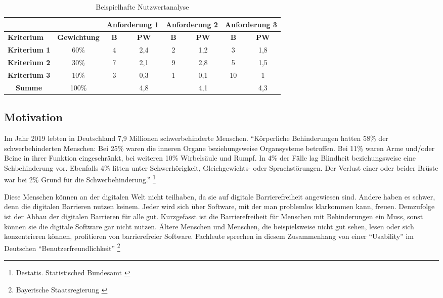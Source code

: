 \begin{table}[H]
\caption[Beispielhafte Nutzwertanalyse]{Beispielhafte Nutzwertanalyse}
\vspace{0,1cm}
\begin{tabular}{cc|c|c|c|c|c|c|}
	\cline{3-8}
	& & \multicolumn{2}{c|}{\textbf{Anforderung 1}} & \multicolumn{2}{c|}{\textbf{Anforderung 2}} & \multicolumn{2}{c|}{\textbf{Anforderung 3}} \\ \hline
	\multicolumn{1}{|l|}{\textbf{Kriterium}} & \textbf{Gewichtung} & \textbf{B} & \textbf{PW} & \textbf{B} & \textbf{PW} & \textbf{B} & \textbf{PW} \\ \hline
	\multicolumn{1}{|l|}{\textbf{Kriterium 1}} & 60\%  & 4 & 2,4 & 2 & 1,2 & 3  & 1,8 \\ \hline
	\multicolumn{1}{|l|}{\textbf{Kriterium 2}} & 30\%  & 7 & 2,1 & 9 & 2,8 & 5  & 1,5 \\ \hline
	\multicolumn{1}{|l|}{\textbf{Kriterium 3}} & 10\%  & 3 & 0,3 & 1 & 0,1 & 10 & 1   \\ \hline
	\multicolumn{1}{|c|}{\textbf{Summe}}       & 100\% &   & 4,8 &   & 4,1 &    & 4,3 \\ \cline{1-2} \cline{4-4} \cline{6-6} \cline{8-8} 
\end{tabular}
\label{table:Beispielhafte Nutzwertanalyse}
\end{table}

\subsection{Motivation}

Im Jahr 2019 lebten in Deutschland 7,9 Millionen schwerbehinderte Menschen. "`Körperliche Behinderungen hatten 58\% der schwerbehinderten Menschen: Bei 25\% waren die inneren Organe beziehungsweise Organsysteme betroffen. Bei 11\% waren Arme und/oder Beine in ihrer Funktion eingeschränkt, bei weiteren 10\% Wirbelsäule und Rumpf. In 4\% der Fälle lag Blindheit beziehungsweise eine Sehbehinderung vor. Ebenfalls 4\% litten unter Schwerhörigkeit, Gleichgewichts- oder Sprachstörungen. Der Verlust einer oder beider Brüste war bei 2\% Grund für die Schwerbehinderung."' \footnote{Destatis. Statistisched Bundesamt \cite{DESTATIS}}

Diese Menschen können an der digitalen Welt nicht teilhaben, da sie auf digitale Barrierefreiheit angewiesen sind. Andere haben es schwer, denn die digitalen Barrieren nutzen keinem. Jeder wird sich über Software, mit der man problemlos klarkommen kann, freuen. Demzufolge ist der Abbau der digitalen Barrieren für alle gut. Kurzgefasst ist die Barrierefreiheit für Menschen mit Behinderungen ein Muss, sonst können sie die digitale Software gar nicht nutzen. Ältere Menschen und Menschen, die beispielsweise nicht gut sehen, lesen oder sich konzentrieren können, profitieren von barrierefreier Software. Fachleute sprechen in diesem Zusammenhang von einer "`Usability"' im Deutschen "`Benutzerfreundlichkeit"' \footnote{Bayerische Staatsregierung \cite{BS}}


